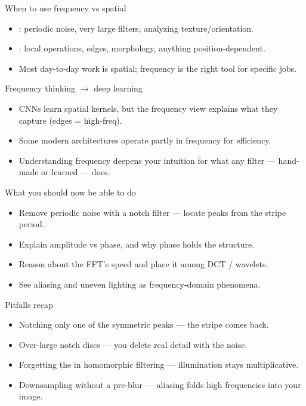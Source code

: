 \documentclass[10pt,aspectratio=169]{beamer}
\begin{document}
\begin{frame}{When to use frequency vs spatial}
  \begin{itemize}
    \item {}: periodic noise, very large filters, analyzing texture/orientation.
    \item {}: local operations, edges, morphology, anything position-dependent.
    \item Most day-to-day work is spatial; frequency is the right tool for specific jobs.
  \end{itemize}
\end{frame}

\begin{frame}{Frequency thinking $\rightarrow$ deep learning}
  \begin{itemize}
    \item CNNs learn spatial kernels, but the frequency view explains what they capture (edges = high-freq).
    \item Some modern architectures operate partly in frequency for efficiency.
    \item Understanding frequency deepens your intuition for what any filter — hand-made or learned — does.
  \end{itemize}
\end{frame}

\begin{frame}{What you should now be able to do}
  \begin{itemize}
    \item Remove periodic noise with a notch filter — locate peaks from the stripe period.
    \item Explain amplitude vs phase, and why phase holds the structure.
    \item Reason about the FFT's speed and place it among DCT / wavelets.
    \item See aliasing and uneven lighting as frequency-domain phenomena.
  \end{itemize}
\end{frame}

\begin{frame}{Pitfalls recap}
  \begin{badbox}
    \begin{itemize}
      \item Notching only one of the symmetric peaks — the stripe comes back.
      \item Over-large notch discs — you delete real detail with the noise.
      \item Forgetting the  in homomorphic filtering — illumination stays multiplicative.
      \item Downsampling without a pre-blur — aliasing folds high frequencies into your image.
    \end{itemize}
  \end{badbox}
\end{frame}
\end{document}
